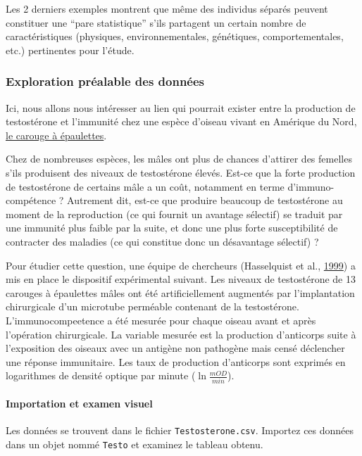 \documentclass[a4paperpaper,]{article}
\let\oldparagraph\paragraph
\renewcommand{\paragraph}[1]{\oldparagraph{#1}\mbox{}}
\begin{document}
Les 2 derniers exemples montrent que même des individus séparés peuvent constituer une ``pare statistique'' s'ils partagent un certain nombre de caractéristiques (physiques, environnementales, génétiques, comportementales, etc.) pertinentes pour l'étude.

\hypertarget{Explo2}{%
\subsubsection{Exploration préalable des données}\label{Explo2}}

Ici, nous allons nous intéresser au lien qui pourrait exister entre la production de testostérone et l'immunité chez une espèce d'oiseau vivant en Amérique du Nord, \href{https://fr.wikipedia.org/wiki/Carouge_à_épaulettes}{le carouge à épaulettes}.

Chez de nombreuses espèces, les mâles ont plus de chances d'attirer des femelles s'ils produisent des niveaux de testostérone élevés. Est-ce que la forte production de testostérone de certains mâle a un coût, notamment en terme d'immuno-compétence ? Autrement dit, est-ce que produire beaucoup de testostérone au moment de la reproduction (ce qui fournit un avantage sélectif) se traduit par une immunité plus faible par la suite, et donc une plus forte susceptibilité de contracter des maladies (ce qui constitue donc un désavantage sélectif) ?

Pour étudier cette question, une équipe de chercheurs (Hasselquist et al., \protect\hyperlink{ref-Hasselquist1999}{1999}) a mis en place le dispositif expérimental suivant. Les niveaux de testostérone de 13 carouges à épaulettes mâles ont été artificiellement augmentés par l'implantation chirurgicale d'un microtube perméable contenant de la testostérone. L'immunocompeetence a été mesurée pour chaque oiseau avant et après l'opération chirurgicale. La variable mesurée est la production d'anticorps suite à l'exposition des oiseaux avec un antigène non pathogène mais censé déclencher une réponse immunitaire. Les taux de production d'anticorps sont exprimés en logarithmes de densité optique par minute (\(\ln\frac{mOD}{min}\)).

\hypertarget{importation-et-examen-visuel-1}{%
\paragraph{Importation et examen visuel}\label{importation-et-examen-visuel-1}}

Les données se trouvent dans le fichier \texttt{Testosterone.csv}. Importez ces données dans un objet nommé \texttt{Testo} et examinez le tableau obtenu.
\end{document}
